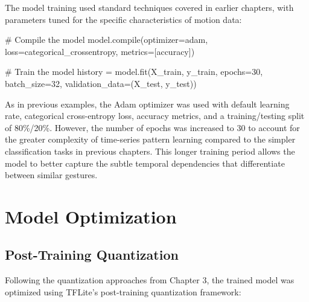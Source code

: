 \documentclass[
  9pt,
  letterpaper,
  abstract,
  titlepage]{scrbook}
\newenvironment{Shaded}{\begin{snugshade}}{\end{snugshade}}
\newcommand{\BuiltInTok}[1]{\textcolor[rgb]{0.00,0.23,0.31}{#1}}
\newcommand{\CommentTok}[1]{\textcolor[rgb]{0.37,0.37,0.37}{#1}}
\newcommand{\DecValTok}[1]{\textcolor[rgb]{0.68,0.00,0.00}{#1}}
\newcommand{\NormalTok}[1]{\textcolor[rgb]{0.00,0.23,0.31}{#1}}
\newcommand{\OperatorTok}[1]{\textcolor[rgb]{0.37,0.37,0.37}{#1}}
\newcommand{\StringTok}[1]{\textcolor[rgb]{0.13,0.47,0.30}{#1}}
\begin{document}
The model training used standard techniques covered in earlier chapters,
with parameters tuned for the specific characteristics of motion data:

\begin{Shaded}
\begin{Highlighting}[]
\CommentTok{\# Compile the model}
\NormalTok{model.}\BuiltInTok{compile}\NormalTok{(optimizer}\OperatorTok{=}\StringTok{\textquotesingle{}adam\textquotesingle{}}\NormalTok{,}
\NormalTok{              loss}\OperatorTok{=}\StringTok{\textquotesingle{}categorical\_crossentropy\textquotesingle{}}\NormalTok{,}
\NormalTok{              metrics}\OperatorTok{=}\NormalTok{[}\StringTok{\textquotesingle{}accuracy\textquotesingle{}}\NormalTok{])}

\CommentTok{\# Train the model}
\NormalTok{history }\OperatorTok{=}\NormalTok{ model.fit(X\_train, y\_train, epochs}\OperatorTok{=}\DecValTok{30}\NormalTok{, batch\_size}\OperatorTok{=}\DecValTok{32}\NormalTok{,}
\NormalTok{                    validation\_data}\OperatorTok{=}\NormalTok{(X\_test, y\_test))}
\end{Highlighting}
\end{Shaded}

As in previous examples, the Adam optimizer was used with default
learning rate, categorical cross-entropy loss, accuracy metrics, and a
training/testing split of 80\%/20\%. However, the number of epochs was
increased to 30 to account for the greater complexity of time-series
pattern learning compared to the simpler classification tasks in
previous chapters. This longer training period allows the model to
better capture the subtle temporal dependencies that differentiate
between similar gestures.

\section{Model Optimization}\label{model-optimization-1}

\subsection{Post-Training
Quantization}\label{post-training-quantization-1}

Following the quantization approaches from Chapter 3, the trained model
was optimized using TFLite's post-training quantization framework:
\end{document}
